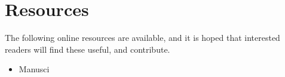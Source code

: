 \section{Resources}

The following online resources are available, and it is hoped that interested readers will find these useful, and contribute.

\begin{itemize}
\item Manusci
\end{itemize}